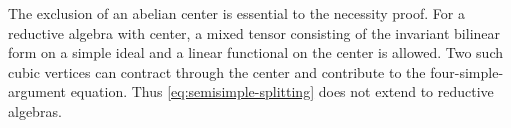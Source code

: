 \begin{remark}
The exclusion of an abelian center is essential to the necessity proof.
For a reductive algebra with center, a mixed tensor consisting of the
invariant bilinear form on a simple ideal and a linear functional on the
center is allowed.  Two such cubic vertices can contract through the
center and contribute to the four-simple-argument equation.  Thus
\eqref{eq:semisimple-splitting} does not extend to reductive algebras.
\end{remark}
